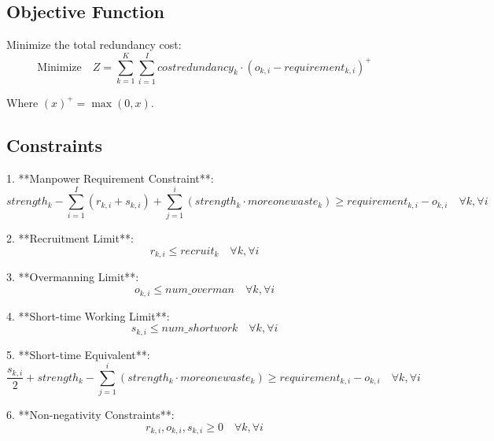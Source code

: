 \documentclass{article}
\begin{document}
\subsection*{Objective Function}
Minimize the total redundancy cost:
\[
\text{Minimize} \quad Z = \sum_{k=1}^{K} \sum_{i=1}^{I} costredundancy_{k} \cdot (o_{k,i} - requirement_{k,i})^+ 
\]

Where \((x)^+ = \max(0, x)\).

\subsection*{Constraints}

1. **Manpower Requirement Constraint**:
   \[
   strength_{k} - \sum_{i=1}^{I} (r_{k,i} + s_{k,i}) + \sum_{j=1}^{i} (strength_{k} \cdot moreonewaste_{k}) \geq requirement_{k,i} - o_{k,i} \quad \forall k, \forall i
   \]

2. **Recruitment Limit**:
   \[
   r_{k,i} \leq recruit_{k} \quad \forall k, \forall i
   \]

3. **Overmanning Limit**:
   \[
   o_{k,i} \leq num\_overman \quad \forall k, \forall i
   \]

4. **Short-time Working Limit**:
   \[
   s_{k,i} \leq num\_shortwork \quad \forall k, \forall i
   \]

5. **Short-time Equivalent**:
   \[
   \frac{s_{k,i}}{2} + strength_{k} - \sum_{j=1}^{i} (strength_{k} \cdot moreonewaste_{k}) \geq requirement_{k,i} - o_{k,i} \quad \forall k, \forall i
   \]

6. **Non-negativity Constraints**:
   \[
   r_{k,i}, o_{k,i}, s_{k,i} \geq 0 \quad \forall k, \forall i
   \]
\end{document}
